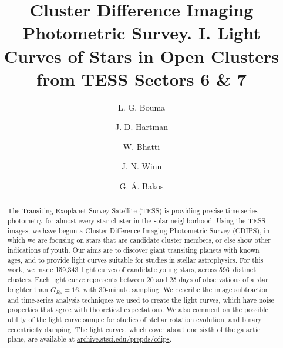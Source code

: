 \documentclass[12pt,twocolumn,tighten]{aastex62}
\newcommand{\numberlcs}{159{,}343\ } %
\newcommand{\numberclusters}{596\ } %
\newcommand{\stscilink}{\url{archive.stsci.edu/prepds/cdips}}
\begin{document}
\title{
  Cluster Difference Imaging Photometric Survey. I.
  Light Curves of Stars in Open Clusters from TESS Sectors 6 \& 7
}


\author[0000-0002-0514-5538]{L. G. Bouma}
%
\author[0000-0001-8732-6166]{J. D. Hartman}
%
\author[0000-0002-0628-0088]{W. Bhatti}
%
\author[0000-0002-4265-047X]{J. N. Winn}
%
\author[0000-0001-7204-6727]{G. \'A. Bakos}

\begin{abstract}
  The Transiting Exoplanet Survey Satellite (TESS) is providing
  precise time-series photometry for almost every star cluster in the
  solar neighborhood.
  Using the TESS images, we have begun a Cluster Difference Imaging
  Photometric Survey (CDIPS), in which we are focusing on stars that
  are candidate cluster members, or else show other indications of
  youth.
  Our aims are to discover giant transiting planets with known ages,
  and to provide light curves suitable for studies in stellar
  astrophysics.
  For this work, we made \numberlcs light curves of candidate young
  stars, across \numberclusters distinct clusters.  Each light curve
  represents between 20 and 25 days of observations of a star brighter
  than $G_{Rp}=16$, with 30-minute sampling.
  We describe the image subtraction and time-series analysis
  techniques we used to create the light curves, which have noise
  properties that agree with theoretical expectations.
  We also comment on the possible utility of the light curve sample
  for studies of stellar rotation evolution, and binary eccentricity
  damping.
  The light curves, which cover about one sixth of the galactic plane,
  are available at \stscilink.
\end{abstract}

\end{document}
